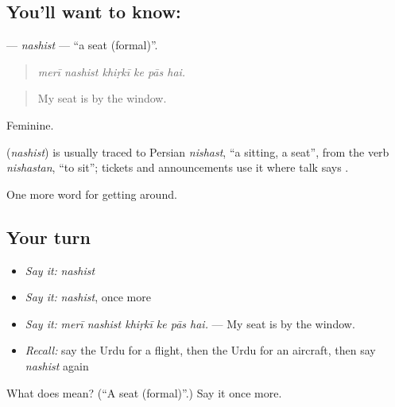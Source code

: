 \subsection*{You'll want to know: }
\textbf{} — \emph{nashist} — \textquotedblleft{}a seat (formal)\textquotedblright{}.

\begin{quote}
     
\end{quote}

\begin{quote}
\emph{merī nashist khiṛkī ke pās hai.}
\end{quote}

\begin{quote}
My seat is by the window.
\end{quote}

Feminine.

\begin{cousinweb}
\textbf{} (\emph{nashist}) is usually traced to Persian \emph{nishast}, \textquotedblleft{}a sitting, a seat\textquotedblright{}, from the verb \emph{nishastan}, \textquotedblleft{}to sit\textquotedblright{}; tickets and announcements use it where talk says \textbf{}.
\end{cousinweb}

\begin{grammarlens}[title={What you've built}]
One more word for getting around.
\end{grammarlens}

\subsection*{Your turn}
\begin{itemize}
\raggedright
  \item \emph{Say it:} \emph{nashist}
  \item \emph{Say it:} \emph{nashist}, once more
  \item \emph{Say it:} \emph{merī nashist khiṛkī ke pās hai.} — My seat is by the window.
  \item \emph{Recall:} say the Urdu for a flight, then the Urdu for an aircraft, then say \emph{nashist} again
\end{itemize}

\begin{tcolorbox}[breakable,colback=teal!4,colframe=teal!35!black,title={Before you move on}]
What does  mean? (\textquotedblleft{}A seat (formal)\textquotedblright{}.) Say it once more.
\end{tcolorbox}

